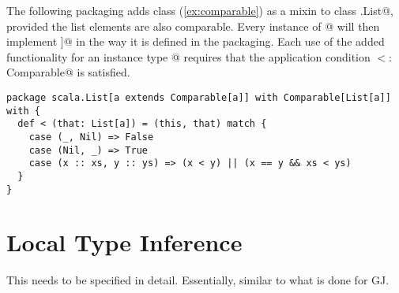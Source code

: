 \documentclass[11pt]{report}
\begin{document}
{\example The following packaging adds class \verb@Comparable@
(\ref{ex:comparable}) as a mixin to class
\verb@scala.List@, provided the list elements are also comparable.
Every instance of \verb@List[$T$]@ will then implement
\verb@Comparable[List[$T$]]@ in the way it is defined in the
packaging. Each use of the added functionality for an instance type
\verb@List[$T$]@ requires that the application condition
\verb@T $<:$ Comparable@ is satisfied.
\begin{verbatim}
package scala.List[a extends Comparable[a]] with Comparable[List[a]] with {
  def < (that: List[a]) = (this, that) match {
    case (_, Nil) => False
    case (Nil, _) => True
    case (x :: xs, y :: ys) => (x < y) || (x == y && xs < ys)
  }
}
\end{verbatim}
}
\chapter{Local Type Inference}
\label{sec:local-type-inf}

This needs to be specified in detail.
Essentially, similar to what is done for GJ.
\end{document}
